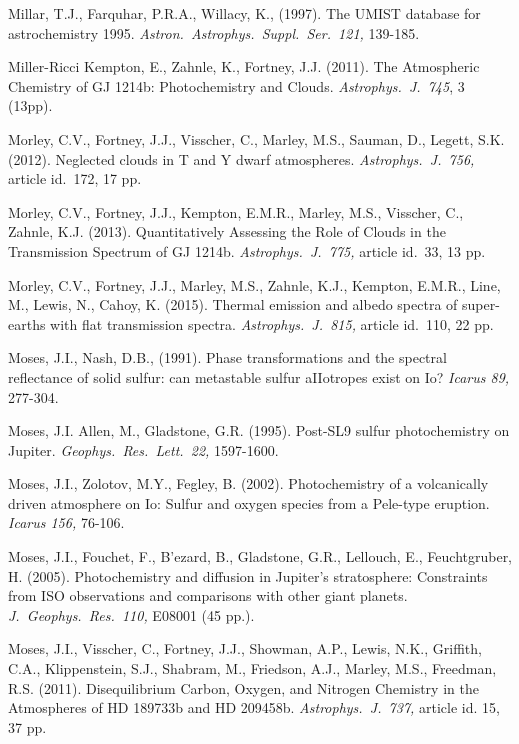 \documentclass[preprint]{aastex6}
\begin{document}
\begin{thebibliography}{00}
Millar, T.J., Farquhar, P.R.A., Willacy, K., (1997).
The UMIST database for astrochemistry 1995.
{\em Astron.\ Astrophys.\ Suppl.\ Ser.\ 121,} 139-185.
 
Miller-Ricci Kempton, E., Zahnle, K., Fortney, J.J. (2011). 
 The Atmospheric Chemistry of GJ 1214b: Photochemistry and Clouds.
 {\em Astrophys.\ J.\ 745}, 3 (13pp).
 
 Morley, C.V., Fortney, J.J., Visscher, C., Marley, M.S., Sauman, D., Legett, S.K. (2012).
 Neglected clouds in T and Y dwarf atmospheres.
 {\em Astrophys.\ J.\ 756,} article id.\ 172, 17 pp.

Morley, C.V., Fortney, J.J., Kempton, E.M.R., Marley, M.S., Visscher, C., Zahnle, K.J. (2013).
Quantitatively Assessing the Role of Clouds in the Transmission Spectrum of GJ 1214b.
{\em Astrophys.\ J.\ 775,} article id.\ 33, 13 pp.

Morley, C.V., Fortney, J.J., Marley, M.S., Zahnle, K.J., Kempton, E.M.R., Line, M., Lewis, N., Cahoy, K. (2015).
Thermal emission and albedo spectra of super-earths with flat transmission spectra.
{\em Astrophys.\ J.\ 815,} article id.\ 110, 22 pp.

Moses, J.I., Nash, D.B., (1991).
Phase transformations and the spectral reflectance of solid
sulfur: can metastable sulfur aIIotropes exist on Io?
{\em Icarus 89,} 277-304.

Moses, J.I. Allen, M., Gladstone, G.R. (1995).
Post-SL9 sulfur photochemistry on Jupiter.
{\em Geophys.\ Res.\ Lett.\ 22,} 1597-1600.

Moses, J.I., Zolotov, M.Y.,  Fegley, B. (2002).
 Photochemistry of a volcanically driven atmosphere on Io: Sulfur and oxygen species from a Pele-type eruption.
{\em Icarus 156,} 76-106.

Moses, J.I., Fouchet, F., B{'e}zard, B., Gladstone, G.R., Lellouch, E., Feuchtgruber, H. (2005).
Photochemistry and diffusion in Jupiter's stratosphere: Constraints from ISO observations and comparisons with other giant planets.
{\em J.\ Geophys.\ Res.\ 110,} E08001 (45 pp.).

Moses, J.I., Visscher, C., Fortney, J.J., Showman, A.P., Lewis, N.K., Griffith, C.A., Klippenstein, S.J., Shabram, M., Friedson, A.J., Marley, M.S., Freedman, R.S. (2011).
Disequilibrium Carbon, Oxygen, and Nitrogen Chemistry in the Atmospheres of HD 189733b and HD 209458b. 
{\em Astrophys.\ J.\ 737,} article id. 15, 37 pp.


\end{thebibliography}
\end{document}
